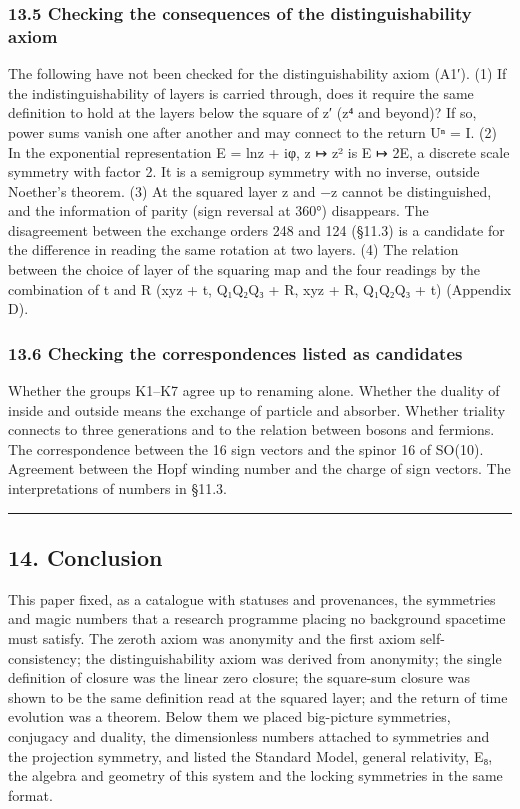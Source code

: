 \documentclass[
  a4paper,
]{article}
\begin{document}
\subsubsection{13.5 Checking the consequences of the distinguishability
axiom}\label{checking-the-consequences-of-the-distinguishability-axiom}

The following have not been checked for the distinguishability axiom
(A1′). (1) If the indistinguishability of layers is carried through,
does it require the same definition to hold at the layers below the
square of z′ (z⁴ and beyond)? If so, power sums vanish one after another
and may connect to the return Uⁿ = I. (2) In the exponential
representation E = ln\textbar z\textbar{} + iφ, z ↦ z² is E ↦ 2E, a
discrete scale symmetry with factor 2. It is a semigroup symmetry with
no inverse, outside Noether's theorem. (3) At the squared layer z and −z
cannot be distinguished, and the information of parity (sign reversal at
360°) disappears. The disagreement between the exchange orders 248 and
124 (§11.3) is a candidate for the difference in reading the same
rotation at two layers. (4) The relation between the choice of layer of
the squaring map and the four readings by the combination of t and R
(xyz + t, Q₁Q₂Q₃ + R, xyz + R, Q₁Q₂Q₃ + t) (Appendix D).

\subsubsection{13.6 Checking the correspondences listed as
candidates}\label{checking-the-correspondences-listed-as-candidates}

Whether the groups K1--K7 agree up to renaming alone. Whether the
duality of inside and outside means the exchange of particle and
absorber. Whether triality connects to three generations and to the
relation between bosons and fermions. The correspondence between the 16
sign vectors and the spinor 16 of SO(10). Agreement between the Hopf
winding number and the charge of sign vectors. The interpretations of
numbers in §11.3.

\begin{center}\rule{0.5\linewidth}{0.5pt}\end{center}

\subsection{14. Conclusion}\label{conclusion}

This paper fixed, as a catalogue with statuses and provenances, the
symmetries and magic numbers that a research programme placing no
background spacetime must satisfy. The zeroth axiom was anonymity and
the first axiom self-consistency; the distinguishability axiom was
derived from anonymity; the single definition of closure was the linear
zero closure; the square-sum closure was shown to be the same definition
read at the squared layer; and the return of time evolution was a
theorem. Below them we placed big-picture symmetries, conjugacy and
duality, the dimensionless numbers attached to symmetries and the
projection symmetry, and listed the Standard Model, general relativity,
E₈, the algebra and geometry of this system and the locking symmetries
in the same format.
\end{document}
